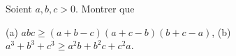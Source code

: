 Soient $a, b, c > 0$. Montrer que

(a) $abc \geq (a + b - c)(a + c - b)(b + c - a)$, (b) $a^3 + b^3 + c^3 \geq a^2b + b^2c + c^2a$.
